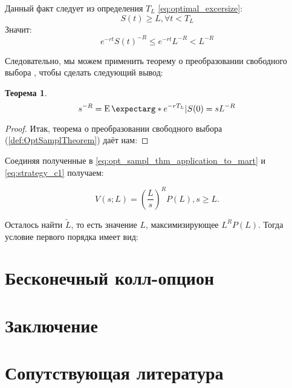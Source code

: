 \documentclass[a4paper,12pt]{article}
\newtheorem{theorem}{Теорема}
\theoremstyle{definition}
\newcommand{\expect}{\operatorname{E}\expectarg}
\begin{document}
Данный факт следует из определения $T_L$ \eqref{eq:optimal_excersize}:
\begin{equation*}
S(t) \ge L, \forall t < T_L
\end{equation*}
Значит:
\begin{equation*}
e^{-rt}S(t)^{-R} \le e^{-rt}L^{-R} < L^{-R}
\end{equation*}

Следовательно, мы можем применить теорему о преобразовании свободного выбора \cite{bib:Shiryaev}, чтобы сделать следующий вывод:
\begin{theorem}
\begin{equation}\label{eq:opt_sampl_thm_application_to_mart}
s^{-R} = \expect*{e^{-rT_L} | S(0) = s} L^{-R}
\end{equation}
\end{theorem}
\begin{proof}
Итак, теорема о преобразовании свободного выбора (\autoref{def:OptSamplTheorem}) даёт нам:
\end{proof}

Соединяя полученные в \eqref{eq:opt_sampl_thm_application_to_mart} и \eqref{eq:strategy_c1} получаем:

\begin{equation}\label{eq:strategy_c1_simplified}
V(s; L) = \left(\frac{L}{s}\right)^{R} P(L), s \ge L.
\end{equation}

Осталось найти $\widetilde{L}$, то есть значение $L$, максимизирующее $L^{R} P(L)$. Тогда условие первого порядка имеет вид:

\section{Бесконечный колл-опцион}

\section{Заключение}

\section{Сопутствующая литература}
\end{document}
